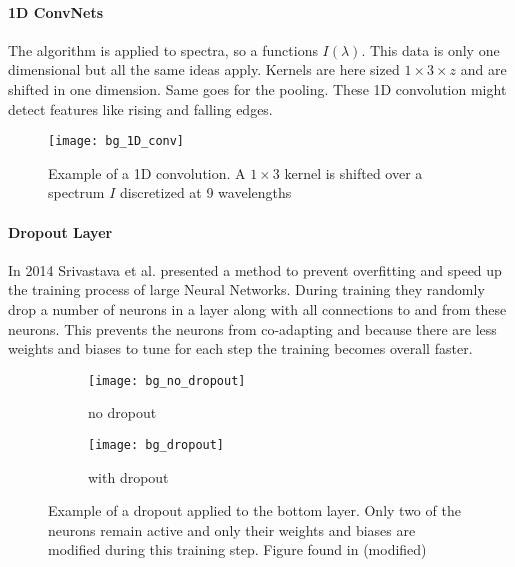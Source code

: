 \newpage
\paragraph{1D ConvNets}
The algorithm is applied to spectra, so a functions $I(\lambda)$. This data is only one dimensional but all the same ideas apply. Kernels are here sized $1 \times 3 \times z$ and are shifted in one dimension. Same goes for the pooling. These 1D convolution might detect features like rising and falling edges.

\begin{figure}[H]
    \centering
    \texttt{[image: bg\_1D\_conv]}
    \caption{Example of a 1D convolution. A $1 \times 3$ kernel is shifted over a spectrum $I$ discretized at 9 wavelengths}
    \label{fig:bg:1D_conv}
\end{figure}

\paragraph{Dropout Layer}
In 2014 Srivastava et al.\cite{Srivastava2014} presented a method to prevent overfitting and speed up the training process of large Neural Networks. During training they randomly drop a number of neurons in a layer along with all connections to and from these neurons. This prevents the neurons from co-adapting  and because there are less weights and biases to tune for each step the training becomes overall faster.
\\

\begin{figure}[H]
\centering
\begin{subfigure}{.5\textwidth}
    \centering
    \texttt{[image: bg\_no\_dropout]}
    \caption{no dropout}
    \label{}
\end{subfigure}%
\begin{subfigure}{.5\textwidth}
    \centering
    \texttt{[image: bg\_dropout]}
    \caption{with dropout}
    \label{}
\end{subfigure}
\caption{Example of a dropout applied to the bottom layer. Only two of the neurons remain active and only their weights and biases are modified during this training step. Figure found in \cite{Srivastava2014} (modified)}
\label{}
\end{figure}
